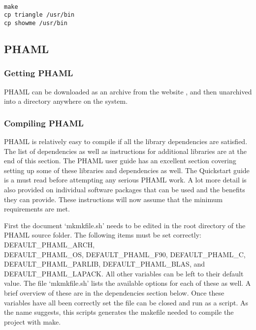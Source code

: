 \begin{framecode}{6in}
\begin{verbatim}

make
cp triangle /usr/bin
cp showme /usr/bin

\end{verbatim}
\end{framecode}

\subsection{PHAML}

\subsubsection{Getting PHAML}
PHAML can be downloaded as an archive from the website \cite{PHAML:website}, and then unarchived into a directory anywhere on the system.

\subsubsection{Compiling PHAML}

PHAML is relatively easy to compile if all the library dependencies are satisfied.  The list of dependencies as well as instructions for additional libraries are at the end of this section.  The PHAML user guide \cite{phamldoc} has an excellent section covering setting up some of these libraries and dependencies as well.  The Quickstart guide is a must read before attempting any serious PHAML work.  A lot more detail is also provided on individual software packages that can be used and the benefits they can provide.  These instructions will now assume that the minimum requirements are met.

First the document `mkmkfile.sh' needs to be edited in the root directory of the PHAML source folder.  The following items must be set correctly: DEFAULT\_PHAML\_ARCH, \\ DEFAULT\_PHAML\_OS, DEFAULT\_PHAML\_F90, DEFAULT\_PHAML\_C, \\ DEFAULT\_PHAML\_PARLIB, DEFAULT\_PHAML\_BLAS, and DEFAULT\_PHAML\_LAPACK.  
All other variables can be left to their default value.  The file `mkmkfile.sh' lists the available options for each of these as well.  A brief overview of these are in the dependencies section below.  Once these variables have all been correctly set the file can be closed and run as a script.  As the name suggests, this scripts generates the makefile needed to compile the project with make.

